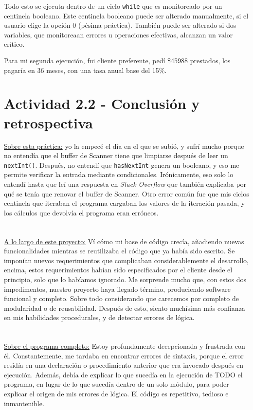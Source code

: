 \documentclass{article}
\begin{document}
			Todo  esto se ejecuta dentro de un ciclo \texttt{while} que es monitoreado por un centinela booleano. Este centinela booleano puede ser
			alterado manualmente, si el usuario elige la opción 0 (pésima práctica). También puede ser alterado si dos variables, que monitoreaan errores
			u operaciones efectivas, alcanzan un valor crítico.

			Para mi segunda ejecución, fui cliente preferente, pedí \$45988 prestados, los pagaría en 36 meses, con una tasa anual base del 15\%.
		\section*{Actividad 2.2 - Conclusión y retrospectiva}
			\underline{Sobre esta práctica:} yo la empecé el día en el que se subió, y sufrí mucho porque no entendía que el buffer de Scanner tiene que
			limpiarse después de leer un \texttt{nextInt()}. Después, no entendí que \texttt{hasNextInt} genera un booleano, y eso me permite verificar
			la entrada mediante condicionales. Irónicamente, eso solo lo entendí hasta que leí una respuesta en \textit{Stack Overflow} que también
			explicaba por qué se tenía que renovar el buffer de Scanner. Otro error común fue que mis ciclos centinela que iteraban el programa cargaban
			los valores de la iteración pasada, y los cálculos que devolvía el programa eran erróneos.
			\\
			\\
			\\
			\underline{A lo largo de este proyecto:} Ví cómo mi base de código crecía, añadiendo nuevas funcionalidades mientras se reutilizaba el código
			que ya había sido escrito. Se imponían nuevos requerimientos que complicaban considerablemente el desarrollo, encima, estos requerimientos
			habían sido especificados por el cliente desde el principio, solo que lo habíamos ignorado. Me sorprende mucho que, con estos dos
			impedimentos, nuestro proyecto haya llegado término, produciendo software funcional y completo. Sobre todo considerando que carecemos por
			completo de modularidad o de reusabilidad. Después de esto, siento muchísima más confianza en mis habilidades procedurales, y de detectar
			errores de lógica.
			\\
			\\
			\\
			\underline{Sobre el programa completo:} Estoy profundamente decepcionada y frustrada con él. Constantemente, me tardaba en encontrar errores
			de sintaxis, porque el error residía en una declaración o procedimiento anterior que era invocado después en ejecución. Además, debía de
			explicar lo que sucedía en la ejecución de TODO el programa, en lugar de lo que sucedía dentro de un solo módulo, para poder explicar el
			origen de mis errores de lógica. El código es repetitivo, tedioso e inmantenible.
\end{document}
